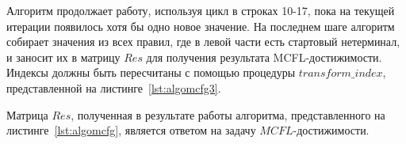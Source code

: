 Алгоритм продолжает работу, используя цикл в строках 10-17, пока на текущей итерации появилось хотя бы одно новое значение. На последнем шаге алгоритм собирает значения из всех правил, где в левой части есть стартовый нетерминал, и заносит их в матрицу $Res$ для получения результата MCFL-достижимости. Индексы должны быть пересчитаны с помощью процедуры $transform\_index$, представленной на листинге~\ref{lst:algomcfg3}.

\begin{algorithm}[H]
	\footnotesize



\end{algorithm}

Матрица $Res$, полученная в результате работы алгоритма, представленного на листинге~\ref{lst:algomcfg}, является ответом на задачу $MCFL$-достижимости.





